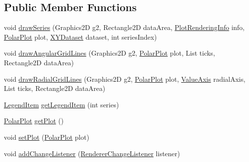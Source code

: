 \subsection*{Public Member Functions}
\begin{DoxyCompactItemize}
\item 
void \mbox{\hyperlink{interfaceorg_1_1jfree_1_1chart_1_1renderer_1_1_polar_item_renderer_ae3e3008460884a712496a363d9103bc8}{draw\+Series}} (Graphics2D g2, Rectangle2D data\+Area, \mbox{\hyperlink{classorg_1_1jfree_1_1chart_1_1plot_1_1_plot_rendering_info}{Plot\+Rendering\+Info}} info, \mbox{\hyperlink{classorg_1_1jfree_1_1chart_1_1plot_1_1_polar_plot}{Polar\+Plot}} plot, \mbox{\hyperlink{interfaceorg_1_1jfree_1_1data_1_1xy_1_1_x_y_dataset}{X\+Y\+Dataset}} dataset, int series\+Index)
\item 
void \mbox{\hyperlink{interfaceorg_1_1jfree_1_1chart_1_1renderer_1_1_polar_item_renderer_a3c554349d8d283adc729bac88b4d017b}{draw\+Angular\+Grid\+Lines}} (Graphics2D g2, \mbox{\hyperlink{classorg_1_1jfree_1_1chart_1_1plot_1_1_polar_plot}{Polar\+Plot}} plot, List ticks, Rectangle2D data\+Area)
\item 
void \mbox{\hyperlink{interfaceorg_1_1jfree_1_1chart_1_1renderer_1_1_polar_item_renderer_ac4353310f0219e6919cec83d3506665d}{draw\+Radial\+Grid\+Lines}} (Graphics2D g2, \mbox{\hyperlink{classorg_1_1jfree_1_1chart_1_1plot_1_1_polar_plot}{Polar\+Plot}} plot, \mbox{\hyperlink{classorg_1_1jfree_1_1chart_1_1axis_1_1_value_axis}{Value\+Axis}} radial\+Axis, List ticks, Rectangle2D data\+Area)
\item 
\mbox{\hyperlink{classorg_1_1jfree_1_1chart_1_1_legend_item}{Legend\+Item}} \mbox{\hyperlink{interfaceorg_1_1jfree_1_1chart_1_1renderer_1_1_polar_item_renderer_a1160128616410b978a4b82ea265fdde2}{get\+Legend\+Item}} (int series)
\item 
\mbox{\hyperlink{classorg_1_1jfree_1_1chart_1_1plot_1_1_polar_plot}{Polar\+Plot}} \mbox{\hyperlink{interfaceorg_1_1jfree_1_1chart_1_1renderer_1_1_polar_item_renderer_a3a7f957c63544df781986d288727a5cf}{get\+Plot}} ()
\item 
void \mbox{\hyperlink{interfaceorg_1_1jfree_1_1chart_1_1renderer_1_1_polar_item_renderer_a1b4dbb3579dbdf195cb5dc0901d387f5}{set\+Plot}} (\mbox{\hyperlink{classorg_1_1jfree_1_1chart_1_1plot_1_1_polar_plot}{Polar\+Plot}} plot)
\item 
void \mbox{\hyperlink{interfaceorg_1_1jfree_1_1chart_1_1renderer_1_1_polar_item_renderer_ad3adac83e60fe6965050e9b2d447642a}{add\+Change\+Listener}} (\mbox{\hyperlink{interfaceorg_1_1jfree_1_1chart_1_1event_1_1_renderer_change_listener}{Renderer\+Change\+Listener}} listener)

\end{DoxyCompactItemize}
